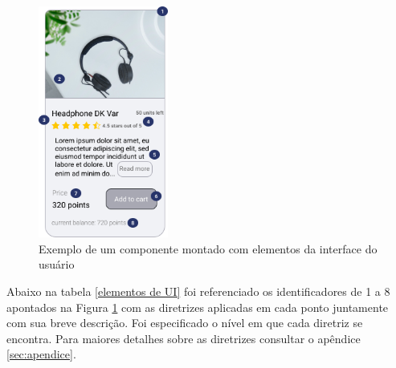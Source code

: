 {\begin{figure}[!htb]
    \centering
	\includegraphics[width=0.38\textwidth]{images/ui-exemplo.png}
    \caption{Exemplo de um componente montado com elementos da interface do usuário}
    \label{fig:UI_componentes}
\end{figure}

Abaixo na tabela \ref{elementos de UI} foi referenciado os identificadores de 1 a 8 apontados na Figura \ref{fig:UI_componentes} com as diretrizes aplicadas em cada ponto juntamente com sua breve descrição. Foi especificado o nível em que cada diretriz se encontra. Para maiores detalhes sobre as diretrizes consultar o apêndice \ref{sec:apendice}.
{


}}
